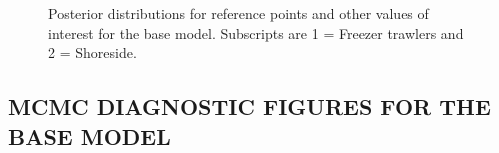 \documentclass[11pt]{book}
\begin{document}
\begin{figure}[H]

{\centering {} 

}

\caption{Posterior distributions for reference points and other values of interest for the base model. Subscripts are 1 = Freezer trawlers and 2 = Shoreside.}\label{fig:fig-base-ref-points}
\end{figure}
\clearpage

\hypertarget{mcmc-diagnostic-figures-for-the-base-model}{%
\subsection{MCMC DIAGNOSTIC FIGURES FOR THE BASE MODEL}\label{mcmc-diagnostic-figures-for-the-base-model}}
\end{document}
